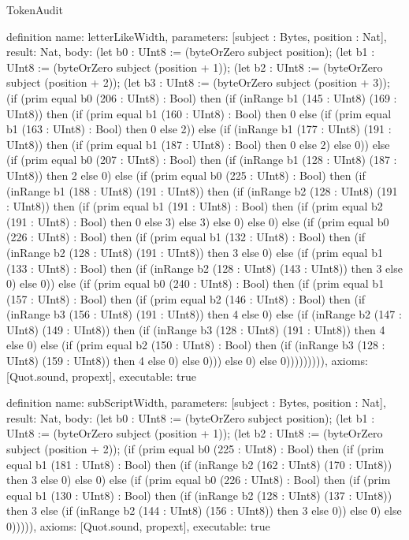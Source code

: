 \begin{lexlean}{TokenAudit}
\begin{semanticmodule}
definition{
  name: letterLikeWidth,
  parameters: [subject : Bytes, position : Nat],
  result: Nat,
  body: (let b0 : UInt8 := (byteOrZero subject position); (let b1 : UInt8 := (byteOrZero subject (position + 1)); (let b2 : UInt8 := (byteOrZero subject (position + 2)); (let b3 : UInt8 := (byteOrZero subject (position + 3)); (if (prim equal b0 (206 : UInt8) : Bool) then (if (inRange b1 (145 : UInt8) (169 : UInt8)) then (if (prim equal b1 (160 : UInt8) : Bool) then 0 else (if (prim equal b1 (163 : UInt8) : Bool) then 0 else 2)) else (if (inRange b1 (177 : UInt8) (191 : UInt8)) then (if (prim equal b1 (187 : UInt8) : Bool) then 0 else 2) else 0)) else (if (prim equal b0 (207 : UInt8) : Bool) then (if (inRange b1 (128 : UInt8) (187 : UInt8)) then 2 else 0) else (if (prim equal b0 (225 : UInt8) : Bool) then (if (inRange b1 (188 : UInt8) (191 : UInt8)) then (if (inRange b2 (128 : UInt8) (191 : UInt8)) then (if (prim equal b1 (191 : UInt8) : Bool) then (if (prim equal b2 (191 : UInt8) : Bool) then 0 else 3) else 3) else 0) else 0) else (if (prim equal b0 (226 : UInt8) : Bool) then (if (prim equal b1 (132 : UInt8) : Bool) then (if (inRange b2 (128 : UInt8) (191 : UInt8)) then 3 else 0) else (if (prim equal b1 (133 : UInt8) : Bool) then (if (inRange b2 (128 : UInt8) (143 : UInt8)) then 3 else 0) else 0)) else (if (prim equal b0 (240 : UInt8) : Bool) then (if (prim equal b1 (157 : UInt8) : Bool) then (if (prim equal b2 (146 : UInt8) : Bool) then (if (inRange b3 (156 : UInt8) (191 : UInt8)) then 4 else 0) else (if (inRange b2 (147 : UInt8) (149 : UInt8)) then (if (inRange b3 (128 : UInt8) (191 : UInt8)) then 4 else 0) else (if (prim equal b2 (150 : UInt8) : Bool) then (if (inRange b3 (128 : UInt8) (159 : UInt8)) then 4 else 0) else 0))) else 0) else 0))))))))),
  axioms: [Quot.sound, propext],
  executable: true
}

definition{
  name: subScriptWidth,
  parameters: [subject : Bytes, position : Nat],
  result: Nat,
  body: (let b0 : UInt8 := (byteOrZero subject position); (let b1 : UInt8 := (byteOrZero subject (position + 1)); (let b2 : UInt8 := (byteOrZero subject (position + 2)); (if (prim equal b0 (225 : UInt8) : Bool) then (if (prim equal b1 (181 : UInt8) : Bool) then (if (inRange b2 (162 : UInt8) (170 : UInt8)) then 3 else 0) else 0) else (if (prim equal b0 (226 : UInt8) : Bool) then (if (prim equal b1 (130 : UInt8) : Bool) then (if (inRange b2 (128 : UInt8) (137 : UInt8)) then 3 else (if (inRange b2 (144 : UInt8) (156 : UInt8)) then 3 else 0)) else 0) else 0))))),
  axioms: [Quot.sound, propext],
  executable: true
}


\end{semanticmodule}
\end{lexlean}
